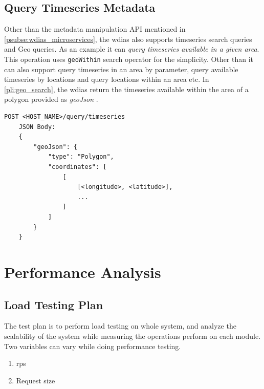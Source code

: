 \documentclass[conference]{IEEEtran}
\begin{document}
\subsection{Query Timeseries Metadata}
\label{psubse:query_timeseries}

Other than the metadata manipulation API mentioned in \cref{psubse:wdias_microservices}, the \acrshort{wdias} also supports timeseries search queries and Geo queries. As an example it can \emph{query timeseries available in a given area}. This operation uses \texttt{geoWithin} search operator for the simplicity. Other than it can also support query timeseries in an area by parameter, query available timeseries by locations and query locations within an area etc. In \cref{pli:geo_search}, the \acrshort{wdias} return the timeseries available within the area of a polygon provided as \emph{geoJson} \cite{InternetEngineeringTaskForceGeoJSON}.

\begin{lstlisting}[caption=Geo search timeseries, label=pli:geo_search]
    POST <HOST_NAME>/query/timeseries
    JSON Body:
    {
        "geoJson": {
            "type": "Polygon",
            "coordinates": [
                [
                    [<longitude>, <latitude>],
                    ...
                ]
            ]
        }
    }
\end{lstlisting}

\section{Performance Analysis}
\label{pse:performance_analysis}

\subsection{Load Testing Plan}
\label{psubse:test_plan}

The test plan is to perform load testing on whole system, and analyze the scalability of the system while measuring the operations perform on each module. Two variables can vary while doing performance testing.
\begin{enumerate}
    \item \acrfull{rps}
    \item Request size
\end{enumerate}
\end{document}
